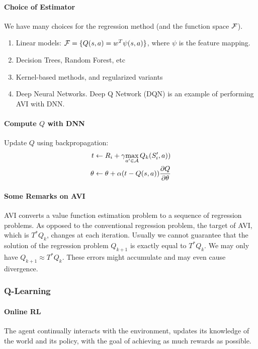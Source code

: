 \documentclass[11pt]{article}
\begin{document}
\paragraph{Choice of Estimator}
We have many choices for the regression method (and the function space $\mathcal{F}$).
\begin{enumerate}
	\item Linear models: $\mathcal{F} = \{Q(s,a) = w^T\psi(s,a)\}$, where $\psi$ is the feature mapping.
	\item Decision Trees, Random Forest, etc
	\item Kernel-based methods, and regularized variants
	\item Deep Neural Networks. Deep Q Network (DQN) is an example of performing AVI with DNN.
\end{enumerate}

\paragraph{Compute $Q$ with DNN}
Update $Q$ using backpropagation:
\begin{align*}
	t &\gets R_i + \gamma \underset{a' \in \mathcal{A}}{\max} \, Q_k(S'_i, a))\\
	\theta &\gets \theta + \alpha(t - Q(s,a))\frac{\partial Q}{\partial \theta}
\end{align*}

\paragraph{Some Remarks on AVI}
AVI converts a value function estimation problem to a sequence of regression problems. As opposed to the conventional regression problem, the target of AVI, which is $T^*Q_k$, changes at each iteration. Usually we cannot guarantee that the solution of the regression problem $Q_{k+1}$ is exactly equal to $T^*Q_k$. We may only have $Q_{k+1} \approx T^*Q_k$. These errors might accumulate and may even cause divergence.



\subsubsection{Q-Learning}
\paragraph{Online RL}
The agent continually interacts with the environment, updates its knowledge of the world and its policy, with the goal of achieving as much rewards as possible.
\end{document}
